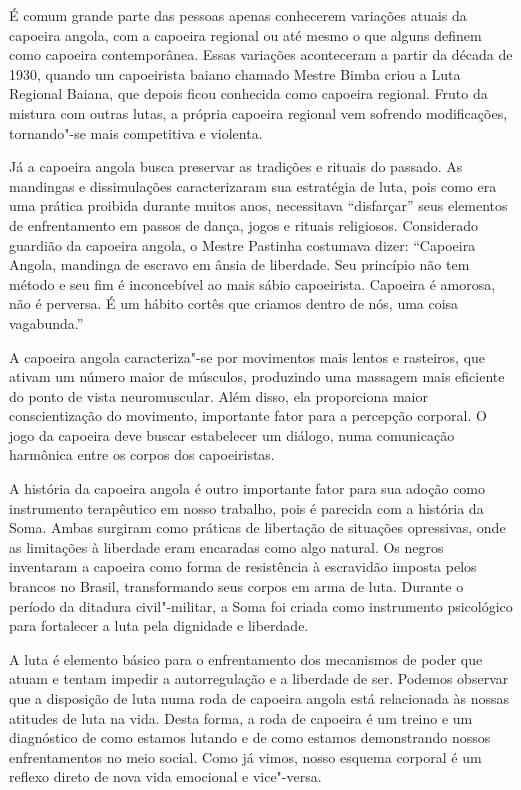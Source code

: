 É comum grande parte das pessoas apenas conhecerem variações atuais da
capoeira angola, com a capoeira regional ou até mesmo o que alguns
definem como capoeira contemporânea. Essas variações aconteceram a
partir da década de 1930, quando um capoeirista baiano chamado Mestre
Bimba criou a Luta Regional Baiana, que depois ficou conhecida como
capoeira regional. Fruto da mistura com outras lutas, a própria capoeira
regional vem sofrendo modificações, tornando"-se mais competitiva e
violenta.

Já a capoeira angola busca preservar as tradições e rituais do passado.
As mandingas e dissimulações caracterizaram sua estratégia de luta, pois
como era uma prática proibida durante muitos anos, necessitava
``disfarçar'' seus elementos de enfrentamento em passos de dança, jogos
e rituais religiosos. Considerado guardião da capoeira angola, o Mestre
Pastinha costumava dizer: ``Capoeira Angola, mandinga de escravo em
ânsia de liberdade. Seu princípio não tem método e seu fim é
inconcebível ao mais sábio capoeirista. Capoeira é amorosa, não é
perversa. É um hábito cortês que criamos dentro de nós, uma coisa
vagabunda.''

A capoeira angola caracteriza"-se por movimentos mais lentos e rasteiros,
que ativam um número maior de músculos, produzindo uma massagem mais
eficiente do ponto de vista neuromuscular. Além disso, ela proporciona
maior conscientização do movimento, importante fator para a percepção
corporal. O jogo da capoeira deve buscar estabelecer um diálogo, numa
comunicação harmônica entre os corpos dos capoeiristas.

A história da capoeira angola é outro importante fator para sua adoção
como instrumento terapêutico em nosso trabalho, pois é parecida com a
história da Soma. Ambas surgiram como práticas de libertação de
situações opressivas, onde as limitações à liberdade eram encaradas como
algo natural. Os negros inventaram a capoeira como forma de resistência
à escravidão imposta pelos brancos no Brasil, transformando seus corpos
em arma de luta. Durante o período da ditadura civil"-militar, a Soma foi
criada como instrumento psicológico para fortalecer a luta pela
dignidade e liberdade.

A luta é elemento básico para o enfrentamento dos mecanismos de poder
que atuam e tentam impedir a autorregulação e a liberdade de ser.
Podemos observar que a disposição de luta numa roda de capoeira angola
está relacionada às nossas atitudes de luta na vida. Desta forma, a roda
de capoeira é um treino e um diagnóstico de como estamos lutando e de
como estamos demonstrando nossos enfrentamentos no meio social. Como já
vimos, nosso esquema corporal é um reflexo direto de nova vida emocional
e vice"-versa.

